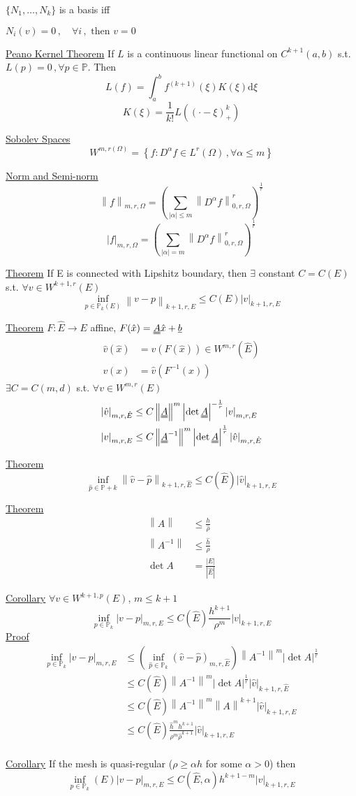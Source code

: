 \documentclass[letterpaper]{article}
\providecommand{\abs}[1]{\left\lvert#1\right\rvert}
\providecommand{\norm}[1]{\left\lVert#1\right\rVert}
\def\d{\mathrm{d}}
\begin{document}
\begin{multicols}{2}
$\{N_1,\dots,N_k\}$ is a basis iff

$N_i(v)=0\,,\quad\forall i\,,\text{ then }v=0$

\uline{Peano Kernel Theorem}
If $L$ is a continuous linear functional on $C^{k+1}(a,b)$ s.t.
$L(p)=0\,,\forall p\in\mathbb{P}$. Then
\[
L(f)=\int_a^b f^{(k+1)}(\xi)K(\xi)\d\xi
\]
\[
K(\xi)=\frac{1}{k!}L\left( (\cdot-\xi)^k_+ \right)
\]

\uline{Sobolev Spaces}
\[
W^{m,r(\Omega)}=\left\{f:D^\alpha f\in L^r(\Omega)\,,\forall\alpha\le m\right\}
\]

\uline{Norm and Semi-norm}
\[
\norm{f}_{m,r,\Omega}=\left(\sum_{\abs{\alpha}\le m}\norm{D^\alpha
f}_{0,r,\Omega}^r\right)^{\frac{1}{r}}
\]
\[
\abs{f}_{m,r,\Omega}=\left(\sum_{\abs{\alpha}=m}\norm{D^\alpha
f}_{0,r,\Omega}^r\right)^{\frac{1}{r}}
\]

\uline{Theorem} If E is connected with Lipshitz boundary, then $\exists$
constant $C=C(E)$ s.t. $\forall v\in W^{k+1,r}(E)$
\[
\inf_{p\in\mathbb{P}_k(E)}\norm{v-p}_{k+1,r,E}\le C(E)\abs{v}_{k+1,r,E}
\]

\uline{Theorem} $F:\hat E\rightarrow E$ affine, $F(\hat x)=\uuline{A}\hat
x+\uline{b}$
\begin{align*}
\hat v(\hat x)&=v(F(\hat x))\in W^{m,r}(\hat E)\\
v(x)&=\hat v(F^{-1}(x))
\end{align*}
$\exists C=C(m,d)$ s.t. $\forall v\in W^{m,r}(E)$
\begin{align*}
\abs{\hat v}_{m,r,\hat E}&\le
C\norm{\uuline{A}}^m\abs{\det\uuline{A}}^{-\frac{1}{r}}\abs{v}_{m,r,E}\\
\abs{v}_{m,r,E}&\le
C\norm{\uuline{A}^{-1}}^m\abs{\det\uuline{A}}^{\frac{1}{r}}\abs{\hat
v}_{m,r,\hat E}
\end{align*}

\uline{Theorem}
\[
\inf_{\hat p\in\mathbb{P}+k}\norm{\hat v-\hat p}_{k+1,r,\hat E}\le C(\hat
E)\abs{\hat v}_{k+1,r,E}
\]

\uline{Theorem}
\begin{align*}
\norm{A}&\le\frac{h}{\hat\rho}\\
\norm{A^{-1}}&\le\frac{\hat h}{\rho}\\
\det A&=\frac{\abs{E}}{|\hat E|}
\end{align*}

\uline{Corollary}
$\forall v\in W^{k+1,p}(E)$, $m\le k+1$
\[
\inf_{p\in \mathbb{P}_k}\abs{v-p}_{m,r,E}\le C(\hat E)\frac{h^{k+1}}{\rho^m}
\abs{v}_{k+1,r,E}
\]
\uline{Proof}
\begin{align*}
\inf_{p\in\mathbb{P}_k}\abs{v-p}_{m,r,E}&\le
\left(\inf_{\hat p\in\mathbb{P}_k}(\hat v-\hat p)_{m,r,\hat E}\right)
\norm{A^{-1}}^m\abs{\det A}^{\frac{1}{r}}\\
&\le C(\hat E)\norm{A^{-1}}^m\abs{\det A}^{\frac{1}{r}}
\abs{\hat v}_{k+1,r,\hat E}\\
&\le C(\hat E)\norm{A^{-1}}^m\norm{A}^{k+1}\abs{\hat v}_{k+1,r,E}\\
&\le C(\hat E)\frac{\hat h^m h^{k+1}}{\rho^m\hat\rho^{k+1}}\abs{\hat v}_{k+1,r,E}\\
\end{align*}

\uline{Corollary}
If the mesh is quasi-regular ($\rho\ge\alpha h$ for some $\alpha>0$) then
\[
\inf_{p\in\mathbb{P}_k}(E)\abs{v-p}_{m,r,E}\le C(\hat E,\alpha)h^{k+1-m}
\abs{v}_{k+1,r,E}
\]
\end{multicols}
\end{document}
